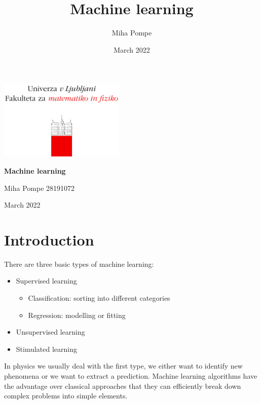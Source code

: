\documentclass[12pt, a4paper]{article}
\title{Machine learning}
\author{Miha Pompe}
\date{March 2022}
\begin{document}
\begin{titlepage}
	\centering
 	\includegraphics[width=0.45\textwidth]{logo_fmf_uni-lj_sl_veliki.png}\par\vspace{1cm}
	\vspace{1cm}
	\vspace{1.5cm}
	{\huge\bfseries Machine learning\par}
	\vspace{2cm}
	{\Large Miha Pompe 28191072\par}
	\vfill
	\vfill
	{\large March 2022\par}
\end{titlepage}
\thispagestyle{empty}
\clearpage
{}
\newpage


\section{Introduction}
There are three basic types of machine learning:
\begin{itemize}
  \item Supervised learning
      \begin{itemize}
        \item Classification: sorting into different categories
        \item Regression: modelling or fitting
      \end{itemize}
  \item Unsupervised learning
  \item Stimulated learning
\end{itemize}
In physics we usually deal with the first type, we either want to identify new phenomena or we want to extract a prediction. Machine learning algorithms have the advantage over classical approaches that they can efficiently break down complex problems into simple elements.
\end{document}
